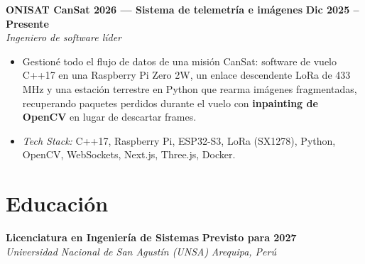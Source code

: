 \documentclass[11pt,letterpaper]{article}
\newcommand{\cventry}[4]{%
  \textbf{#1} \hfill \textbf{#2}\\
  \textit{#3} \hfill \textit{#4}\par\nobreak\vspace{1pt}%
}
\begin{document}

\cventry{ONISAT CanSat 2026 --- Sistema de telemetría e imágenes}{Dic 2025 -- Presente}{Ingeniero de software líder}{}
\begin{itemize}
  \item Gestioné todo el flujo de datos de una misión CanSat: software de vuelo C++17 en una Raspberry Pi Zero 2W, un enlace descendente LoRa de 433 MHz y una estación terrestre en Python que rearma imágenes fragmentadas, recuperando paquetes perdidos durante el vuelo con \textbf{inpainting de OpenCV} en lugar de descartar frames.
  \item \textit{Tech Stack:} C++17, Raspberry Pi, ESP32-S3, LoRa (SX1278), Python, OpenCV, WebSockets, Next.js, Three.js, Docker.
\end{itemize}

\section{Educación}
\cventry{Licenciatura en Ingeniería de Sistemas}{Previsto para 2027}{Universidad Nacional de San Agustín (UNSA)}{Arequipa, Perú}
\end{document}
